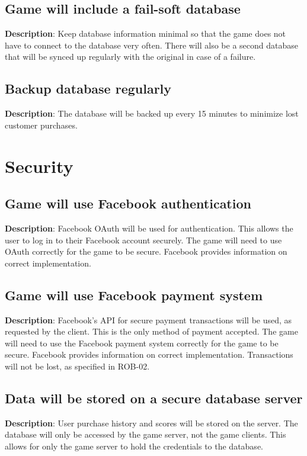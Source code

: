 \subsection{Game will include a fail-soft database}
\textbf{Description}: Keep database information minimal so that the game does
not have to connect to the database very often. There will also be
a second database that will be synced up regularly with the original
in case of a failure.

\subsection{Backup database regularly}
\textbf{Description}: The database will be backed up every 15 minutes to minimize
lost customer purchases.

\section{Security}
\renewcommand\thesubsection{SEC-%
\ifnum\value{subsection}<10 0\fi
\arabic{subsection}}
\subsection{Game will use Facebook authentication}
\textbf{Description}: Facebook OAuth will be used for authentication. This
allows the user to log in to their Facebook account securely. The
game will need to use OAuth correctly for the game to be secure. Facebook
provides information on correct implementation.

\subsection{Game will use Facebook payment system}
\textbf{Description}: Facebook\textquoteright{}s API for secure payment transactions
will be used, as requested by the client. This is the only method
of payment accepted. The game will need to use the Facebook payment
system correctly for the game to be secure. Facebook provides information
on correct implementation. Transactions will not be lost, as specified
in ROB-02.

\subsection{Data will be stored on a secure database server}
\textbf{Description}: User purchase history and scores will be stored on the
server. The database will only be accessed by the game server, not
the game clients. This allows for only the game server to hold the
credentials to the database. 

